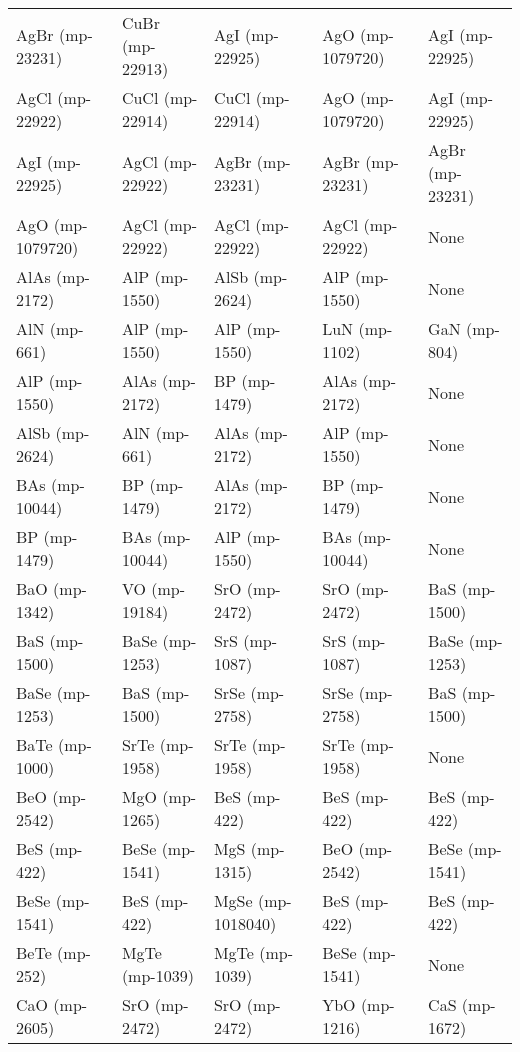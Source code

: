 \begin{longtable}{lllll}
\bottomrule
\endlastfoot
  AgBr (mp-23231) &   CuBr (mp-22913) &    AgI (mp-22925) &  AgO (mp-1079720) &    AgI (mp-22925) \\
  AgCl (mp-22922) &   CuCl (mp-22914) &   CuCl (mp-22914) &  AgO (mp-1079720) &    AgI (mp-22925) \\
   AgI (mp-22925) &   AgCl (mp-22922) &   AgBr (mp-23231) &   AgBr (mp-23231) &   AgBr (mp-23231) \\
 AgO (mp-1079720) &   AgCl (mp-22922) &   AgCl (mp-22922) &   AgCl (mp-22922) &              None \\
   AlAs (mp-2172) &     AlP (mp-1550) &    AlSb (mp-2624) &     AlP (mp-1550) &              None \\
     AlN (mp-661) &     AlP (mp-1550) &     AlP (mp-1550) &     LuN (mp-1102) &      GaN (mp-804) \\
    AlP (mp-1550) &    AlAs (mp-2172) &      BP (mp-1479) &    AlAs (mp-2172) &              None \\
   AlSb (mp-2624) &      AlN (mp-661) &    AlAs (mp-2172) &     AlP (mp-1550) &              None \\
   BAs (mp-10044) &      BP (mp-1479) &    AlAs (mp-2172) &      BP (mp-1479) &              None \\
     BP (mp-1479) &    BAs (mp-10044) &     AlP (mp-1550) &    BAs (mp-10044) &              None \\
    BaO (mp-1342) &     VO (mp-19184) &     SrO (mp-2472) &     SrO (mp-2472) &     BaS (mp-1500) \\
    BaS (mp-1500) &    BaSe (mp-1253) &     SrS (mp-1087) &     SrS (mp-1087) &    BaSe (mp-1253) \\
   BaSe (mp-1253) &     BaS (mp-1500) &    SrSe (mp-2758) &    SrSe (mp-2758) &     BaS (mp-1500) \\
   BaTe (mp-1000) &    SrTe (mp-1958) &    SrTe (mp-1958) &    SrTe (mp-1958) &              None \\
    BeO (mp-2542) &     MgO (mp-1265) &      BeS (mp-422) &      BeS (mp-422) &      BeS (mp-422) \\
     BeS (mp-422) &    BeSe (mp-1541) &     MgS (mp-1315) &     BeO (mp-2542) &    BeSe (mp-1541) \\
   BeSe (mp-1541) &      BeS (mp-422) & MgSe (mp-1018040) &      BeS (mp-422) &      BeS (mp-422) \\
    BeTe (mp-252) &    MgTe (mp-1039) &    MgTe (mp-1039) &    BeSe (mp-1541) &              None \\
    CaO (mp-2605) &     SrO (mp-2472) &     SrO (mp-2472) &     YbO (mp-1216) &     CaS (mp-1672) \\

\end{longtable}
